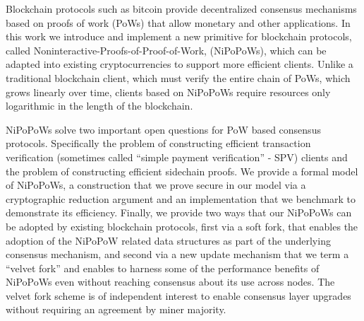 Blockchain protocols such as bitcoin provide decentralized consensus
mechanisms based on proofs of work (PoWs) 
that allow monetary and other applications. 
%
In this work we introduce and implement a new primitive for blockchain protocols, called Noninteractive-Proofs-of-Proof-of-Work, (NiPoPoWs), which can be adapted into existing cryptocurrencies to support more efficient clients.
Unlike a traditional blockchain client, which must verify the entire chain of PoWs, which grows linearly over time, clients based on NiPoPoWs require resources only logarithmic in the length of the blockchain.

NiPoPoWs solve two important open questions for PoW based consensus
protocols. Specifically the problem  
of constructing efficient transaction verification (sometimes called
``simple payment verification'' - SPV) clients and 
the problem of constructing efficient sidechain proofs. 
%
%
We provide a formal model of NiPoPoWs, a construction that we prove
secure in our model 
via a cryptographic reduction argument and 
an implementation that we benchmark to demonstrate  its efficiency. 
Finally, we provide two ways that our NiPoPoWs can be adopted by
 existing blockchain protocols, first via a soft fork, that enables the 
   adoption of the NiPoPoW related data structures
  as part of the underlying consensus mechanism, 
 and second  via a new update mechanism 
that we term a ``velvet fork'' and enables to harness some of
the performance benefits of NiPoPoWs even without reaching consensus about its use
across nodes. The velvet fork scheme is of independent interest to enable
consensus layer upgrades without requiring an agreement by miner majority.


